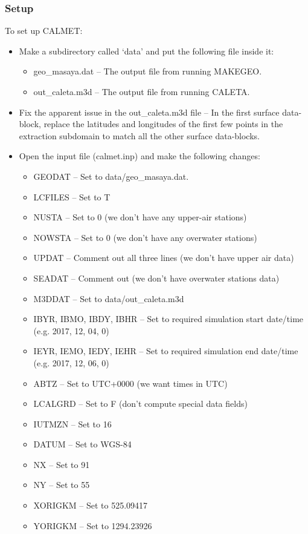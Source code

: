 \documentclass[10pt,a4paper]{article}
\begin{document}
\subsubsection{Setup}
To set up CALMET:
\begin{itemize}
\item Make a subdirectory called `data' and put the following file inside it:
\begin{itemize}
\item geo\_masaya.dat -- The output file from running MAKEGEO.
\item out\_caleta.m3d -- The output file from running CALETA.
\end{itemize}
\item Fix the apparent issue in the out\_caleta.m3d file -- In the first surface data-block, replace the latitudes and longitudes of the first few points in the extraction subdomain to match all the other surface data-blocks.
\item Open the input file (calmet.inp) and make the following changes:
\begin{itemize}
\item GEODAT -- Set to data/geo\_masaya.dat.
\item LCFILES -- Set to T
\item NUSTA -- Set to 0 (we don't have any upper-air stations)
\item NOWSTA -- Set to 0 (we don't have any overwater stations)
\item UPDAT -- Comment out all three lines (we don't have upper air data)
\item SEADAT -- Comment out (we don't have overwater stations data)
\item M3DDAT -- Set to data/out\_caleta.m3d
\item IBYR, IBMO, IBDY, IBHR -- Set to required simulation start date/time (e.g. 2017, 12, 04, 0)
\item IEYR, IEMO, IEDY, IEHR -- Set to required simulation end date/time (e.g. 2017, 12, 06, 0)
\item ABTZ -- Set to UTC+0000 (we want times in UTC)
\item LCALGRD -- Set to F (don't compute special data fields)
\item IUTMZN -- Set to 16
\item DATUM -- Set to WGS-84
\item NX -- Set to 91
\item NY -- Set to 55
\item XORIGKM -- Set to 525.09417
\item YORIGKM -- Set to 1294.23926

\end{itemize}
\end{itemize}
\end{document}
